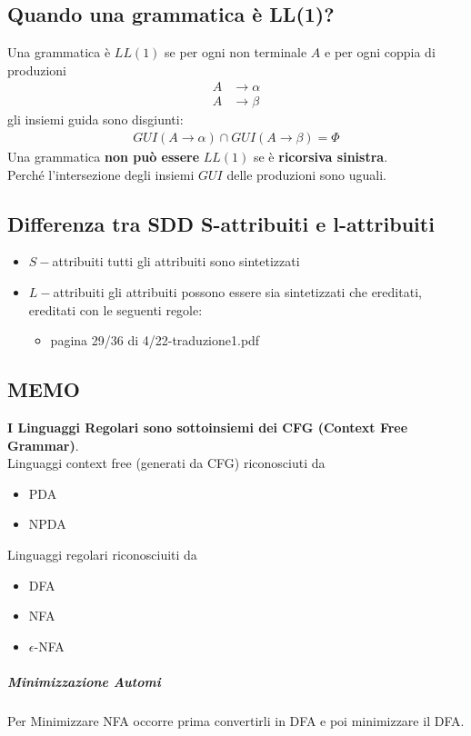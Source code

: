 \documentclass[12pt]{article}
\begin{document}
\subsection{Quando una grammatica è LL(1)?}
Una grammatica è $LL(1)$ se per ogni non terminale $A$ e per ogni coppia di produzioni
\begin{align*}
    A &\rightarrow \alpha\\
    A &\rightarrow \beta
\end{align*}
gli insiemi guida sono disgiunti:
\begin{align*}
    GUI(A \rightarrow \alpha) \cap GUI(A \rightarrow \beta) = \Phi
\end{align*}
Una grammatica \textbf{non può essere} $LL(1)$ se è \textbf{ricorsiva sinistra}.\\
Perché l'intersezione degli
insiemi $GUI$ delle produzioni sono uguali.
\subsection{Differenza tra SDD S-attribuiti e l-attribuiti}
\begin{itemize}
    \item $S-$attribuiti tutti gli attribuiti sono sintetizzati
    \item $L-$attribuiti gli attribuiti possono essere sia sintetizzati che ereditati, ereditati con le seguenti regole:
    \begin{itemize}
        \item pagina 29/36 di 4/22-traduzione1.pdf
    \end{itemize}
\end{itemize}
\subsection{MEMO}
\textbf{I Linguaggi Regolari sono sottoinsiemi dei CFG (Context Free Grammar)}.\\
Linguaggi context free (generati da CFG) riconosciuti da
\begin{itemize}
    \item PDA
    \item NPDA
\end{itemize}
Linguaggi regolari riconosciuiti da
\begin{itemize}
    \item DFA
    \item NFA
    \item $\epsilon$-NFA %
  \end{itemize}
\subparagraph*{Minimizzazione Automi}
Per Minimizzare NFA occorre prima convertirli in DFA e poi minimizzare il DFA.
\end{document}
